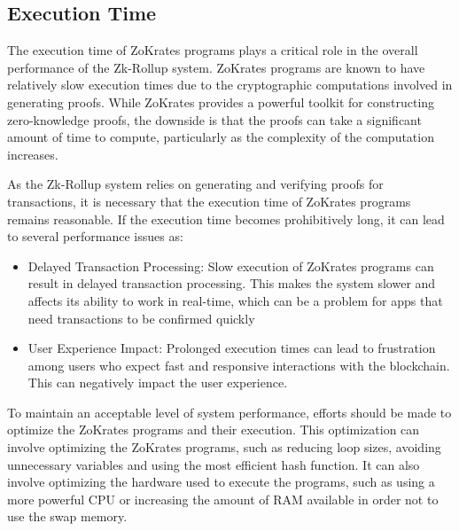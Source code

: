 \subsection{Execution Time}

The execution time of ZoKrates programs plays a critical role in the overall performance of the Zk-Rollup system. ZoKrates programs are known to have relatively slow execution times due to the cryptographic computations involved in generating proofs. While ZoKrates provides a powerful toolkit for constructing zero-knowledge proofs, the downside is that the proofs can take a significant amount of time to compute, particularly as the complexity of the computation increases.

As the Zk-Rollup system relies on generating and verifying proofs for transactions, it is necessary that the execution time of ZoKrates programs remains reasonable. If the execution time becomes prohibitively long, it can lead to several performance issues as:

\begin{itemize}
    \item Delayed Transaction Processing: Slow execution of ZoKrates programs can result in delayed transaction processing. This makes the system slower and affects its ability to work in real-time, which can be a problem for apps that need transactions to be confirmed quickly
    \item User Experience Impact: Prolonged execution times can lead to frustration among users who expect fast and responsive interactions with the blockchain. This can negatively impact the user experience.
\end{itemize}

To maintain an acceptable level of system performance, efforts should be made to optimize the ZoKrates programs and their execution. This optimization can involve optimizing the ZoKrates programs, such as reducing loop sizes, avoiding unnecessary variables and using the most efficient hash function. It can also involve optimizing the hardware used to execute the programs, such as using a more powerful CPU or increasing the amount of RAM available in order not to use the swap memory.
